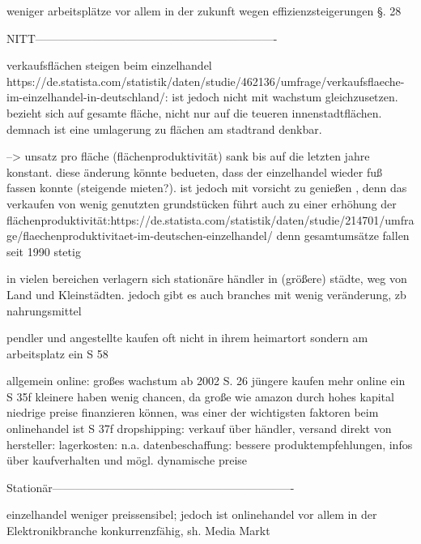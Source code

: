         weniger arbeitsplätze vor allem in der zukunft wegen effizienzsteigerungen \S. 28
        
        
        NITT----------------------------------------------------------------
        
        verkaufsflächen steigen beim einzelhandel https://de.statista.com/statistik/daten/studie/462136/umfrage/verkaufsflaeche-im-einzelhandel-in-deutschland/: ist jedoch nicht mit wachstum gleichzusetzen. bezieht sich auf gesamte fläche, nicht nur auf die teueren innenstadtflächen. demnach ist eine umlagerung zu flächen am stadtrand denkbar.
        
        --> unsatz pro fläche (flächenproduktivität) sank bis auf die letzten jahre konstant. diese änderung könnte bedueten, dass der einzelhandel wieder fuß fassen konnte (steigende mieten?). ist jedoch mit vorsicht zu genießen , denn das verkaufen von wenig genutzten grundstücken führt auch zu einer erhöhung der flächenproduktivität:https://de.statista.com/statistik/daten/studie/214701/umfrage/flaechenproduktivitaet-im-deutschen-einzelhandel/
        denn gesamtumsätze fallen seit 1990 stetig\cite[S. 6]{Nitt}
        
        in vielen bereichen verlagern sich stationäre händler in (größere) städte, weg von Land und Kleinstädten. jedoch gibt es auch branches mit wenig veränderung, zb nahrungsmittel
        
        pendler und angestellte kaufen oft nicht in ihrem heimartort sondern am arbeitsplatz ein S 58
    
    
    
    
    
    
        
        allgemein online: großes wachstum ab 2002 S. 26
            jüngere kaufen mehr online ein S 35f
            kleinere haben wenig chancen, da große wie amazon durch hohes kapital niedrige preise finanzieren können, was einer der wichtigsten faktoren beim onlinehandel ist S 37f
            dropshipping: verkauf über händler, versand direkt von hersteller: lagerkosten: n.a.
            datenbeschaffung: bessere produktempfehlungen, infos über kaufverhalten und mögl. dynamische preise
            
    
        
        Stationär----------------------------------------------------------------


            einzelhandel weniger preissensibel; jedoch ist onlinehandel vor allem in der Elektronikbranche konkurrenzfähig, sh. Media Markt\cite[S. 21f]{Graf}

